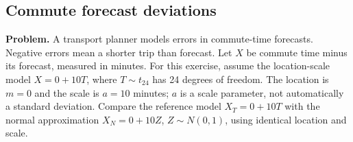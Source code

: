 
\clearpage
\subsection{Commute forecast deviations}
\label{c9-d5}
\textbf{Problem.} A transport planner models errors in commute-time forecasts. Negative errors mean a shorter trip than forecast. Let $X$ be commute time minus its forecast, measured in minutes. For this exercise, assume the location-scale model $X=0+10T$, where $T\sim t_{24}$ has 24 degrees of freedom. The location is $m=0$ and the scale is $a=10$ minutes; $a$ is a scale parameter, not automatically a standard deviation. Compare the reference model $X_T=0+10T$ with the normal approximation $X_N=0+10Z$, $Z\sim N(0,1)$, using identical location and scale.
